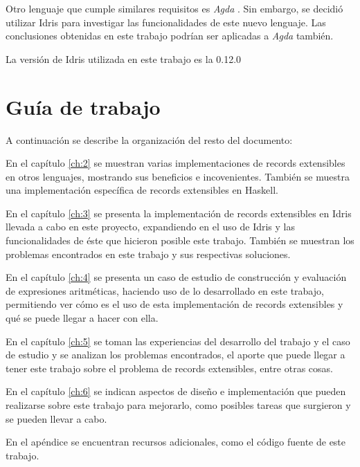 Otro lenguaje que cumple similares requisitos es \textit{Agda} \cite{Norell:2009:DTP:1481861.1481862}. Sin embargo, se decidió utilizar Idris para investigar las funcionalidades de este nuevo lenguaje. Las conclusiones obtenidas en este trabajo podrían ser aplicadas a \textit{Agda} también.

La versión de Idris utilizada en este trabajo es la 0.12.0

\section{Guía de trabajo}

A continuación se describe la organización del resto del documento:

En el capítulo \ref{ch:2} se muestran varias implementaciones de records extensibles en otros lenguajes, mostrando sus beneficios e incovenientes. También se muestra una implementación específica de records extensibles en Haskell.

En el capítulo \ref{ch:3} se presenta la implementación de records extensibles en Idris llevada a cabo en este proyecto, expandiendo en el uso de Idris y las funcionalidades de éste que hicieron posible este trabajo. También se muestran los problemas encontrados en este trabajo y sus respectivas soluciones.

En el capítulo \ref{ch:4} se presenta un caso de estudio de construcción y evaluación de expresiones aritméticas, haciendo uso de lo desarrollado en este trabajo, permitiendo ver cómo es el uso de esta implementación de records extensibles y qué se puede llegar a hacer con ella.

En el capítulo \ref{ch:5} se toman las experiencias del desarrollo del trabajo y el caso de estudio y se analizan los problemas encontrados, el aporte que puede llegar a tener este trabajo sobre el problema de records extensibles, entre otras cosas.

En el capítulo \ref{ch:6} se indican aspectos de diseño e implementación que pueden realizarse sobre este trabajo para mejorarlo, como posibles tareas que surgieron y se pueden llevar a cabo.

En el apéndice se encuentran recursos adicionales, como el código fuente de este trabajo.

